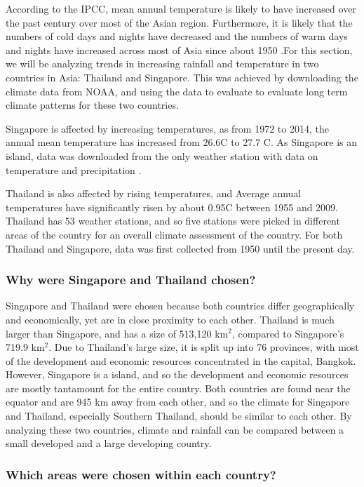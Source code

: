 According to the IPCC, mean annual temperature is likely to have increased over the past century over most of the Asian region. Furthermore, it is likely that the numbers of cold days and nights have decreased and the numbers of warm days and nights have increased across most of Asia since about 1950 \citep{ipcc}.For this section, we will be analyzing trends in increasing rainfall and temperature in two countries in Asia: Thailand and Singapore. This was achieved by downloading the climate data from NOAA, and using the data to evaluate to evaluate long term climate patterns for these two countries. 

Singapore is affected by increasing temperatures, as from 1972 to 2014, the annual mean temperature has increased from 26.6\degree C to 27.7 \degree C. As Singapore is an island, data was downloaded from the only weather station with data on temperature and precipitation \citep{singaporeclimatechange}. 

Thailand is also affected by rising temperatures, and Average annual temperatures have significantly risen by about 0.95\degree C between 1955 and 2009. Thailand has 53 weather stations, and so five stations were picked in different areas of the country for an overall climate assessment of the country. For  both Thailand and Singapore, data was first collected from 1950 until the present day. 

\subsubsection{Why were Singapore and Thailand chosen?}

Singapore and Thailand were chosen because both countries differ geographically and economically, yet are in close proximity to each other. Thailand is much larger than Singapore, and has a size of 513,120 km$^2$, compared to Singapore's 719.9 km$^2$. Due to Thailand's large size, it is split up into 76 provinces, with most of the development and economic resources concentrated in the capital, Bangkok. However, Singapore is a island, and so the development and economic resources are mostly tantamount for the entire country. Both countries are found near the equator and are 945 km away from each other, and so the climate for Singapore and Thailand, especially Southern Thailand, should be similar to each other. By analyzing these two countries, climate and rainfall can be compared between a small developed and a large developing country.

\subsubsection{Which areas were chosen within each country?}

